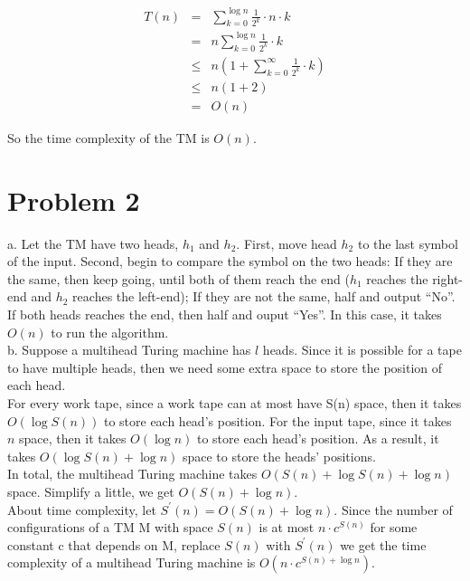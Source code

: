 \documentclass[12pt]{article}
\begin{document}
\begin{eqnarray*}
  T(n) &=&    \sum_{k = 0}^{\log n} {\frac {1}{2^k} \cdot n \cdot k}
              \nonumber \\
       &=&  n \sum_{k = 0}^{\log n} {\frac {1}{2^k} \cdot k} 
              \nonumber \\
       &\leq& n (1 + \sum_{k = 0}^{\infty} {\frac {1}{2^k} \cdot k}) 
              \nonumber \\
       &\leq& n (1 + 2) \nonumber \\
       &=&    O(n)
\end{eqnarray*}

So the time complexity of the TM is $O(n)$.

\section*{Problem 2}

a. Let the TM have two heads, $h_1$ and $h_2$. First, move head
$h_2$ to the last symbol of the input. Second, begin to compare the
symbol on the two heads: If they are the same, then keep going, until
both of them reach the end ($h_1$ reaches the right-end and $h_2$
reaches the left-end); If they are not the same, half and output
``No''. If both heads reaches the end, then half and ouput ``Yes''. In
this case, it takes $O(n)$ to run the algorithm.\\

b. Suppose a multihead Turing machine has $l$ heads. Since it is
possible for a tape to have multiple heads, then we need some extra
space to store the position of each head.\\

For every work tape, since a work tape can at most have S(n) space,
then it takes $O(\log {S(n)})$ to store each head's position. For the
input tape, since it takes $n$ space, then it takes $O(\log {n})$ to
store each head's position. As a result, it takes $O(\log {S(n)} +
\log {n})$ space to store the heads' positions.\\

In total, the multihead Turing machine takes $O(S(n) + \log {S(n)} +
\log {n})$ space. Simplify a little, we get $O(S(n) + \log {n})$.\\

About time complexity, let $S^{'}(n) = O(S(n) + \log {n})$. Since
the number of configurations of a TM M with space $S(n)$ is at most
$n \cdot c^{S(n)}$ for some constant c that depends on M, replace
$S(n)$ with $S^{'}(n)$ we get the time complexity of a multihead
Turing machine is $O(n \cdot c^{S(n) + \log {n}})$.
\end{document}
